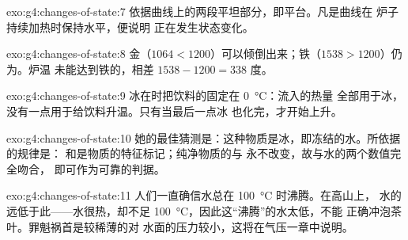 \begin{solution}{exo:g4:changes-of-state:7}
依据曲线上的两段平坦部分，即平台。凡是曲线在
炉子持续加热时保持水平，便说明
正在发生状态变化。
\end{solution}

\begin{solution}{exo:g4:changes-of-state:8}
金（$1064 < 1200$）可以倾倒出来；铁（$1538 > 1200$）仍为。炉温
未能达到铁的，相差 $1538 - 1200 = 338$ 度。
\end{solution}

\begin{solution}{exo:g4:changes-of-state:9}
冰在时把饮料的固定在 \qty{0}{\celsius}：流入的热量
全部用于冰，没有一点用于给饮料升温。只有当最后一点冰
也化完，才开始上升。
\end{solution}

\begin{solution}{exo:g4:changes-of-state:10}
她的最佳猜测是：这种物质是冰，即冻结的水。所依据的规律是：
和是物质的特征标记；纯净物质的与
永不改变，故与水的两个数值完全吻合，
即可作为可靠的判据。
\end{solution}

\begin{solution}{exo:g4:changes-of-state:11}
人们一直确信水总在 \qty{100}{\celsius} 时沸腾。在高山上，
水的远低于此——水很热，却不足
\qty{100}{\celsius}，因此这“沸腾”的水太低，不能
正确冲泡茶叶。罪魁祸首是较稀薄的对
水面的压力较小，这将在气压一章中说明。
\end{solution}
